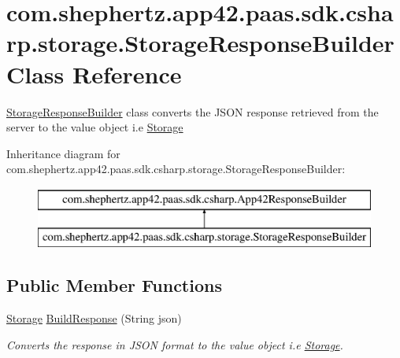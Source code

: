 \hypertarget{classcom_1_1shephertz_1_1app42_1_1paas_1_1sdk_1_1csharp_1_1storage_1_1_storage_response_builder}{\section{com.\+shephertz.\+app42.\+paas.\+sdk.\+csharp.\+storage.\+Storage\+Response\+Builder Class Reference}
\label{classcom_1_1shephertz_1_1app42_1_1paas_1_1sdk_1_1csharp_1_1storage_1_1_storage_response_builder}
}


\hyperlink{classcom_1_1shephertz_1_1app42_1_1paas_1_1sdk_1_1csharp_1_1storage_1_1_storage_response_builder}{Storage\+Response\+Builder} class converts the J\+S\+O\+N response retrieved from the server to the value object i.\+e \hyperlink{classcom_1_1shephertz_1_1app42_1_1paas_1_1sdk_1_1csharp_1_1storage_1_1_storage}{Storage}  


Inheritance diagram for com.\+shephertz.\+app42.\+paas.\+sdk.\+csharp.\+storage.\+Storage\+Response\+Builder\+:\begin{figure}[H]
\begin{center}
\leavevmode
\includegraphics[height=2.000000cm]{classcom_1_1shephertz_1_1app42_1_1paas_1_1sdk_1_1csharp_1_1storage_1_1_storage_response_builder}
\end{center}
\end{figure}
\subsection*{Public Member Functions}
\begin{DoxyCompactItemize}
\item 
\hyperlink{classcom_1_1shephertz_1_1app42_1_1paas_1_1sdk_1_1csharp_1_1storage_1_1_storage}{Storage} \hyperlink{classcom_1_1shephertz_1_1app42_1_1paas_1_1sdk_1_1csharp_1_1storage_1_1_storage_response_builder_add7da4de788fc83a503b99817240fa82}{Build\+Response} (String json)
\begin{DoxyCompactList}\small\item\em Converts the response in J\+S\+O\+N format to the value object i.\+e \hyperlink{classcom_1_1shephertz_1_1app42_1_1paas_1_1sdk_1_1csharp_1_1storage_1_1_storage}{Storage}. \end{DoxyCompactList}\end{DoxyCompactItemize}


